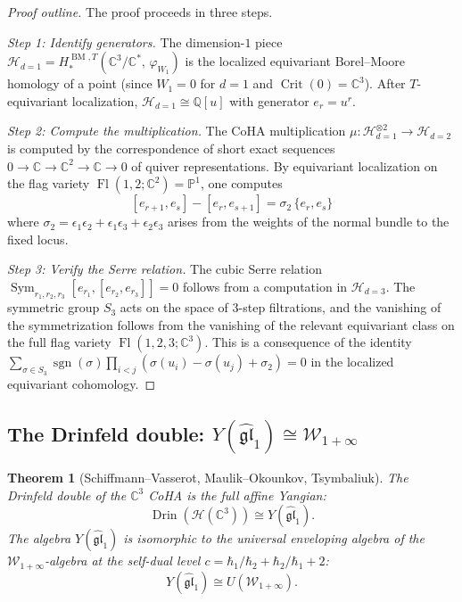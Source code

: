 \documentclass[11pt]{article}
\newtheorem{theorem}{Theorem}[section]
\theoremstyle{definition}
\theoremstyle{remark}
\newcommand{\CC}{\mathbb{C}}
\newcommand{\QQ}{\mathbb{Q}}
\newcommand{\Crit}{\operatorname{Crit}}
\newcommand{\CoHA}{\mathcal{H}}
\newcommand{\cW}{\mathcal{W}}
\newcommand{\BM}{\operatorname{BM}}
\newcommand{\gl}{\mathfrak{gl}}
\begin{document}
\begin{proof}[Proof outline]
The proof proceeds in three steps.

\emph{Step 1: Identify generators.}
The dimension-$1$ piece $\CoHA_{d=1} = H^{\BM,T}_*(\CC^3/\CC^*,\, \varphi_{W_1})$
is the localized equivariant Borel--Moore homology of a point (since $W_1 = 0$
for $d=1$ and $\Crit(0) = \CC^3$). After $T$-equivariant localization,
$\CoHA_{d=1} \cong \QQ[u]$ with generator $e_r = u^r$.

\emph{Step 2: Compute the multiplication.}
The CoHA multiplication $\mu \colon \CoHA_{d=1}^{\otimes 2} \to \CoHA_{d=2}$
is computed by the correspondence of short exact sequences
$0 \to \CC \to \CC^2 \to \CC \to 0$ of quiver representations.
By equivariant localization on the flag variety
$\operatorname{Fl}(1,2; \CC^2) = \mathbb{P}^1$, one computes
\[
 [e_{r+1}, e_s] - [e_r, e_{s+1}] = \sigma_2\, \{e_r, e_s\}
\]
where $\sigma_2 = \epsilon_1\epsilon_2 + \epsilon_1\epsilon_3 + \epsilon_2\epsilon_3$
arises from the weights of the normal bundle to the fixed locus.

\emph{Step 3: Verify the Serre relation.}
The cubic Serre relation $\operatorname{Sym}_{r_1,r_2,r_3} [e_{r_1},[e_{r_2},e_{r_3}]] = 0$
follows from a computation in $\CoHA_{d=3}$. The symmetric group $S_3$ acts
on the space of 3-step filtrations, and the vanishing of the symmetrization
follows from the vanishing of the relevant equivariant class on the full flag
variety $\operatorname{Fl}(1,2,3;\CC^3)$. This is a consequence of
the identity $\sum_{\sigma \in S_3} \operatorname{sgn}(\sigma) \prod_{i<j}
(\sigma(u_i) - \sigma(u_j) + \sigma_2) = 0$ in the localized equivariant
cohomology.
\end{proof}


\subsection{The Drinfeld double: $Y(\widehat{\gl}_1) \cong \cW_{1+\infty}$}
\label{subsec:drinfeld-double-c3}

\begin{theorem}[Schiffmann--Vasserot, Maulik--Okounkov, Tsymbaliuk]
\label{thm:drinfeld-double-c3}
The Drinfeld double of the $\CC^3$ CoHA is the full affine Yangian:
\[
 \operatorname{Drin}(\CoHA(\CC^3)) \cong Y(\widehat{\gl}_1).
\]
The algebra $Y(\widehat{\gl}_1)$ is isomorphic to the universal enveloping
algebra of the $\cW_{1+\infty}$-algebra at the self-dual level
$c = \hbar_1/\hbar_2 + \hbar_2/\hbar_1 + 2$:
\[
 Y(\widehat{\gl}_1) \cong U(\cW_{1+\infty}).
\]
\end{theorem}
\end{document}
